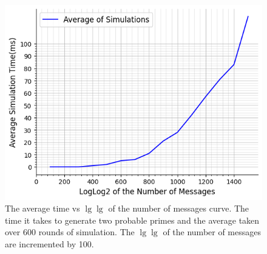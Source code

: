 \begin{figure}
	\includegraphics*[height = 0.4 \textheight]{graphic/time47.png}
	\caption{The average time vs \(\lg \lg \) of the number of messages curve. The time it takes to generate two probable primes and the average taken over 600 rounds of simulation. The \(\lg \lg \) of the number of messages are incremented by 100.}
\end{figure}
